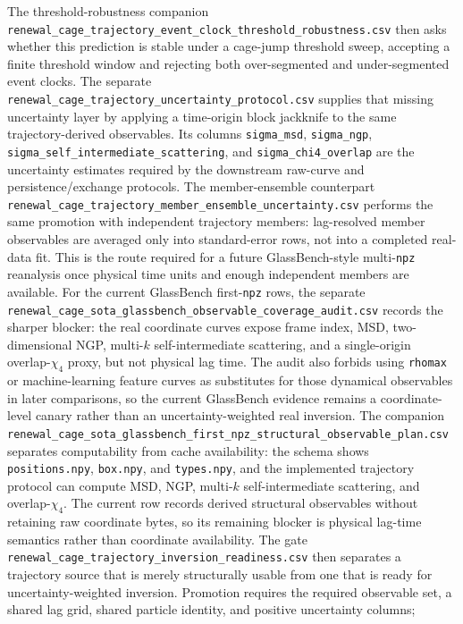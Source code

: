 \documentclass[aps,preprint,onecolumn,superscriptaddress,nofootinbib]{revtex4-2}
\begin{document}
The threshold-robustness companion
\texttt{renewal\_cage\_trajectory\_event\_clock\_threshold\_robustness.csv}
then asks whether this prediction is stable under a cage-jump threshold sweep,
accepting a finite threshold window and rejecting both over-segmented and
under-segmented event clocks.
The separate
\texttt{renewal\_cage\_trajectory\_uncertainty\_protocol.csv} supplies that
missing uncertainty layer by applying a time-origin block jackknife to the same
trajectory-derived observables. Its columns
\texttt{sigma\_msd}, \texttt{sigma\_ngp}, \texttt{sigma\_self\_intermediate\_scattering},
and \texttt{sigma\_chi4\_overlap} are the uncertainty estimates required by the
downstream raw-curve and persistence/exchange protocols.
The member-ensemble counterpart
\texttt{renewal\_cage\_trajectory\_member\_ensemble\_uncertainty.csv} performs the
same promotion with independent trajectory members: lag-resolved member
observables are averaged only into standard-error rows, not into a completed
real-data fit. This is the route required for a future GlassBench-style
multi-\texttt{npz} reanalysis once physical time units and enough independent
members are available.
For the current GlassBench first-\texttt{npz} rows, the separate
\texttt{renewal\_cage\_sota\_glassbench\_observable\_coverage\_audit.csv}
records the sharper blocker: the real coordinate curves expose frame index,
MSD, two-dimensional NGP, multi-\(k\) self-intermediate scattering, and a
single-origin overlap-\(\chi_4\) proxy, but not physical lag time. The audit
also forbids using \texttt{rhomax} or machine-learning feature curves as
substitutes for those dynamical observables in later comparisons, so the
current GlassBench evidence remains a coordinate-level canary rather than an
uncertainty-weighted real inversion.
The companion
\texttt{renewal\_cage\_sota\_glassbench\_first\_npz\_structural\_observable\_plan.csv}
separates computability from cache availability: the schema shows
\texttt{positions.npy}, \texttt{box.npy}, and \texttt{types.npy}, and the
implemented trajectory protocol can compute MSD, NGP, multi-\(k\)
self-intermediate scattering, and overlap-\(\chi_4\). The current row records
derived structural observables without retaining raw coordinate bytes, so its
remaining blocker is physical lag-time semantics rather than coordinate
availability.
The gate
\texttt{renewal\_cage\_trajectory\_inversion\_readiness.csv} then separates a
trajectory source that is merely structurally usable from one that is ready for
uncertainty-weighted inversion. Promotion requires the required observable set,
a shared lag grid, shared particle identity, and positive uncertainty columns;
\end{document}
